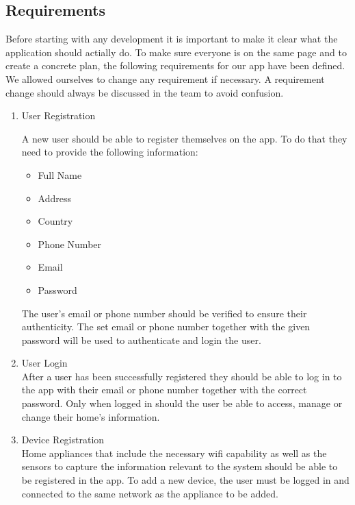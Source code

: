\documentclass[10pt]{article}
\begin{document}
\begin{multicols*}{2}
\clearpage

\section{Requirements}

Before starting with any development it is important to make it clear what the application should actially do. To make sure everyone is on the same page and to create a concrete plan, the following requirements for our app have been defined. We allowed ourselves to change any requirement if necessary. A requirement change should always be discussed in the team to avoid confusion.

\begin{enumerate}
  \item {User Registration}
  
  A new user should be able to register themselves on the app. To do that they need to provide the following information:

  \begin{itemize}
    \item Full Name
  
    \item Address
  
    \item Country
  
    \item Phone Number
  
    \item Email
  
    \item Password
  
  \end{itemize}

  The user's email or phone number should be verified to ensure their authenticity. The set email or phone number together with the given password will be used to authenticate and login the user.

  \item {User Login}\\
  After a user has been successfully registered they should be able to log in to the app with their email or phone number together with the correct password. Only when logged in should the user be able to access, manage or change their home's information.

  \item {Device Registration} \\
  Home appliances that include the necessary wifi capability as well as the sensors to capture the information relevant to the system should be able to be registered in the app. To add a new device, the user must be logged in and connected to the same network as the appliance to be added.
  

\end{enumerate}
\end{multicols*}
\end{document}
